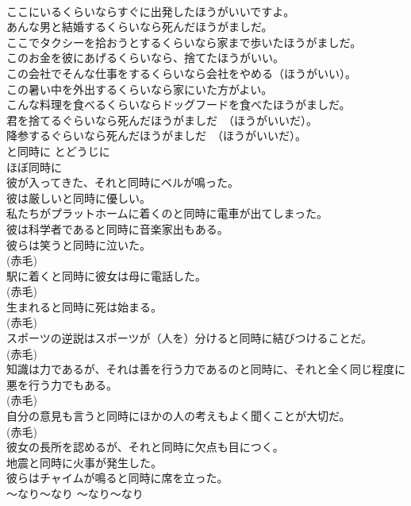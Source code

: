 \documentclass[8pt]{extreport}
\begin{document}
\begin{CJK}{UTF8}{min}
\\	ここにいるくらいならすぐに出発したほうがいいですよ。  
\\	あんな男と結婚するくらいなら死んだほうがましだ。  
\\	ここでタクシーを拾おうとするくらいなら家まで歩いたほうがましだ。  
\\	このお金を彼にあげるくらいなら、捨てたほうがいい。  
\\	この会社でそんな仕事をするくらいなら会社をやめる（ほうがいい）。  
\\	この暑い中を外出するくらいなら家にいた方がよい。  
\\	こんな料理を食べるくらいならドッグフードを食べたほうがましだ。  
\\	君を捨てるぐらいなら死んだほうがましだ　（ほうがいいだ）。   
\\	降参するぐらいなら死んだほうがましだ　（ほうがいいだ）。   
\\	と同時に	とどうじに	
\\	ほぼ同時に	
\\	彼が入ってきた、それと同時にベルが鳴った。	
\\	彼は厳しいと同時に優しい。  
\\	私たちがプラットホームに着くのと同時に電車が出てしまった。  
\\	彼は科学者であると同時に音楽家出もある。  
\\	彼らは笑うと同時に泣いた。  
\\	(赤毛)
\\	駅に着くと同時に彼女は母に電話した。  
\\	(赤毛)
\\	生まれると同時に死は始まる。  
\\	(赤毛)
\\	スポーツの逆説はスポーツが（人を）分けると同時に結びつけることだ。  
\\	(赤毛)
\\	知識は力であるが、それは善を行う力であるのと同時に、それと全く同じ程度に悪を行う力でもある。  
\\	(赤毛)
\\	自分の意見も言うと同時にほかの人の考えもよく聞くことが大切だ。  
\\	(赤毛)
\\	彼女の長所を認めるが、それと同時に欠点も目につく。   
\\	地震と同時に火事が発生した。   
\\	彼らはチャイムが鳴ると同時に席を立った。   
\\	〜なり〜なり	〜なり〜なり	

\end{CJK}
\end{document}
